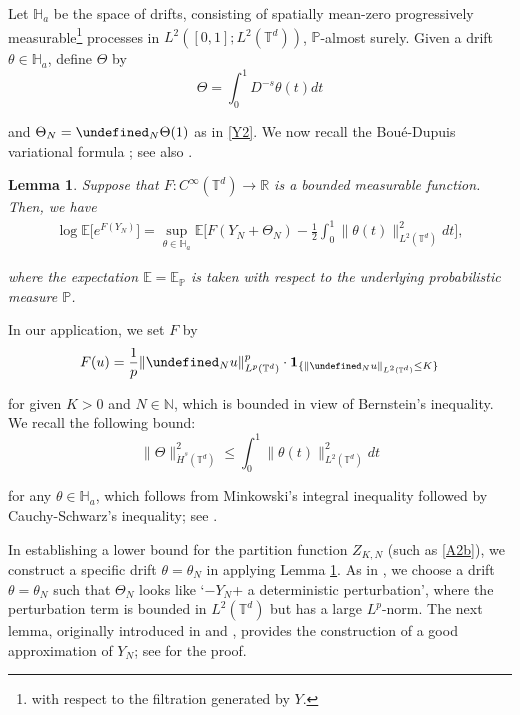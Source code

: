 \documentclass[letterpaper, 11pt,  reqno]{amsart}
\newtheorem{lemma}[theorem]{Lemma}
\newcommand{\noi}{\noindent}
\newcommand{\T}{\mathbb{T}}
\let\P= \undefined
\newcommand{\P}{\mathbf{P}}
\newcommand{\E}{\mathbb{E}}
\newcommand{\ta}{\theta}
\newcommand{\ind}{\mathbf 1}
\newcommand{\N}{\mathbb{N}}
\numberwithin{equation}{section}
\numberwithin{theorem}{section}
\newcommand{\PP}{\mathbb{P}}
\newcommand{\dr}{\theta}
\newcommand{\Dr}{\Theta}
\newcommand{\Ha}{\mathbb{H}_a}
\begin{document}
\quad 
Let $\mathbb{H}_a$ be the space of drifts, consisting of
spatially mean-zero progressively 
measurable\footnote{with respect to  the filtration generated by $Y$.}
processes
in $L^2 ([0, 1] ; L^2 (\mathbb{T}^d))$, $\PP$-almost surely.
Given a drift $\dr \in \Ha$, 
define
 $\Theta$ by 
\begin{equation}
\Theta = \int_0^1 D^{- s} \theta (t) dt
\label{var3}
\end{equation}


\noi
and $\Dr_N = \P_N \Dr(1) $ as in \eqref{Y2}.
We now recall the Bou\'e-Dupuis variational formula
\cite{BD98,U14, Zhang09};
see also \cite[Appendix A]{TW23}.

\begin{lemma}
\label{LEM:var} 
 Suppose that $F: C^\infty(\T^d) \to \mathbb{R}$ is
a bounded measurable function.
Then, we have
\begin{align}\label{var2} 
\log\E \big[e^{F (Y_N)}\big] = \sup_{\theta \in\Ha} 
\E \bigg[ F (Y_N + \Theta_N) - \frac{1}{2} \int_0^1\| \theta (t) \|^2_{L^2 (\mathbb{T}^d)} d t \bigg], 
\end{align}

\noi
where 
 the expectation $\mathbb{E}=\mathbb{E}_{\PP}$ is taken with respect to
the underlying probabilistic measure $\PP$.
\end{lemma}



In our application, we set $F$ by 
\[F (u) = 
 \frac 1 p \| \P_N u\|^p_{L^p(\T^d)} \cdot 
 \ind_{\{ \| \P_{N} u \|_{L^2 (\mathbb{T}^d)}\leq K \}}\]

\noi
for given $K > 0$ and $N \in \N$, 
which is bounded in view of Bernstein's inequality.
We recall the following bound:
\begin{equation}
\label{var4} 
\| \Theta \|^2_{\dot{H}^s (\mathbb{T}^d)}
\leq \int_0^1 \| \theta (t) \|^2_{L^2 (\mathbb{T}^d)} d t
\end{equation}

\noi
for any $\ta \in \Ha$, 
which follows from 
Minkowski's integral inequality followed by Cauchy-Schwarz's inequality;
see \cite[Lemma 4.7]{GOTW}.










In establishing a lower bound 
for  the partition function $Z_{K, N}$
(such as \eqref{A2b}), 
we construct a specific drift $\ta = \ta_N$ 
in applying  Lemma \ref{LEM:var}.
As in \cite{OST, LW22, GOTT}, 
we choose a drift $\ta = \ta_N$  such that 
$\Dr_N$ looks like
`$-Y_N$+ a deterministic perturbation', where the perturbation term is bounded in 
$L^2(\T^d)$ but  has a large $L^p$-norm.
The next lemma, originally introduced
in \cite[Lemma 2.1]{TW23}
and  \cite[Lemma 3.4]{OST}, 
 provides
the construction of a good approximation of $Y_N$;
see \cite[Lemma 3.5]{LW22}
for the proof.
\end{document}
